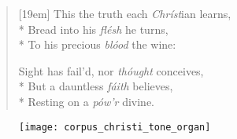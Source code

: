 \documentclass[12pt]{memoir}
\begin{document}
\begin{multicols}{2}
\begin{verse}[19em]
This the truth each \textit{Chr\'{i}st}ian learns, \\*
Bread into his \textit{fl\'{e}sh} he turns, \\*
To his precious \textit{bl\'{o}od} the wine:

Sight has fail'd, nor \textit{th\'{o}ught} conceives, \\*
But a dauntless \textit{f\'{a}ith} believes, \\*
Resting on a \textit{p\'{o}w'r} divine.

\end{verse}
\end{multicols}

\begin{center}

	\begin{figure}[!h]
		\texttt{[image: corpus\_christi\_tone\_organ]}
	\end{figure} 
	
\end{center}
\end{document}
